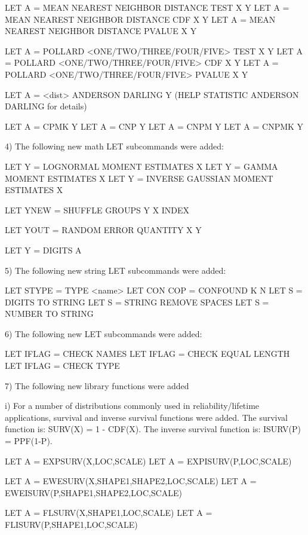           LET A = MEAN NEAREST NEIGHBOR DISTANCE TEST X Y
          LET A = MEAN NEAREST NEIGHBOR DISTANCE CDF X Y
          LET A = MEAN NEAREST NEIGHBOR DISTANCE PVALUE X Y
          
          LET A = POLLARD <ONE/TWO/THREE/FOUR/FIVE> TEST X Y
          LET A = POLLARD <ONE/TWO/THREE/FOUR/FIVE> CDF X Y
          LET A = POLLARD <ONE/TWO/THREE/FOUR/FIVE> PVALUE X Y

          LET A = <dist> ANDERSON DARLING Y
          (HELP STATISTIC ANDERSON DARLING for details)

          LET A = CPMK  Y
          LET A = CNP   Y
          LET A = CNPM  Y
          LET A = CNPMK Y

 4) The following new math LET subcommands were added:

          LET Y = LOGNORMAL MOMENT ESTIMATES X
          LET Y = GAMMA MOMENT ESTIMATES X
          LET Y = INVERSE GAUSSIAN MOMENT ESTIMATES X

          LET YNEW = SHUFFLE GROUPS Y X INDEX

          LET YOUT = RANDOM ERROR QUANTITY X Y

          LET Y = DIGITS A

 5) The following new string LET subcommands were added:

          LET STYPE = TYPE <name>
          LET CON COP = CONFOUND K N
          LET S = DIGITS TO STRING
          LET S = STRING REMOVE SPACES
          LET S = NUMBER TO STRING

 6) The following new LET subcommands were added:

          LET IFLAG = CHECK NAMES
          LET IFLAG = CHECK EQUAL LENGTH
          LET IFLAG = CHECK TYPE

 7) The following new library functions were added

      i) For a number of distributions commonly used in
         reliability/lifetime applications, survival and
         inverse survival functions were added.  The
         survival function is:  SURV(X) = 1 - CDF(X). The
         inverse survival function is: ISURV(P) = PPF(1-P).

          LET A = EXPSURV(X,LOC,SCALE)
          LET A = EXPISURV(P,LOC,SCALE)

          LET A = EWESURV(X,SHAPE1,SHAPE2,LOC,SCALE)
          LET A = EWEISURV(P,SHAPE1,SHAPE2,LOC,SCALE)

          LET A = FLSURV(X,SHAPE1,LOC,SCALE)
          LET A = FLISURV(P,SHAPE1,LOC,SCALE)

